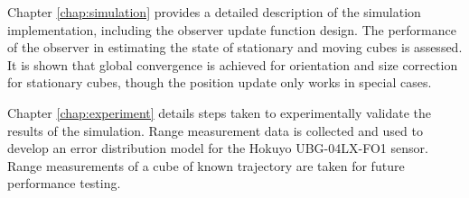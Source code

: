 Chapter \ref{chap:simulation} provides a detailed description of the simulation implementation, including the observer update function design. The performance of the observer in estimating the state of stationary and moving cubes is assessed. It is shown that global convergence is achieved for orientation and size correction for stationary cubes, though the position update only works in special cases.

Chapter \ref{chap:experiment} details steps taken to experimentally validate the results of the simulation. Range measurement data is collected and used to develop an error distribution model for the Hokuyo UBG-04LX-FO1 sensor. Range measurements of a cube of known trajectory are taken for future performance testing.



